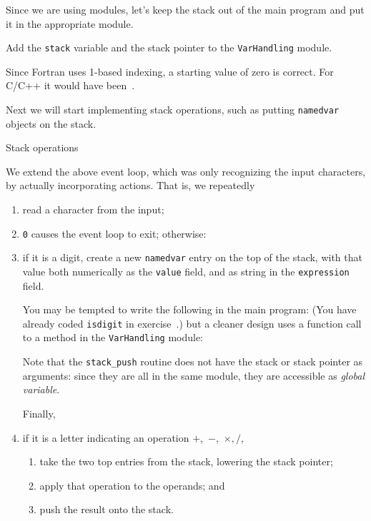 Since we are using modules, let's keep the stack out of the main program
and put it in the appropriate module.

\begin{exercise}
  \label{ex:f-stack-in-mod}
  Add the \lstinline{stack} variable and the stack pointer
  to the \lstinline{VarHandling} module.
\end{exercise}

Since Fortran uses 1-based indexing,
a starting value of zero is correct.
For C/C++ it would have been~.

Next we will start implementing stack operations,
such as putting \lstinline{namedvar} objects on the stack.

 {Stack operations}

We extend the above event loop,
which was only recognizing the input characters,
by actually incorporating actions.
That is, we repeatedly
\begin{enumerate}
\item read a character from the input;
\item \lstinline{0} causes the event loop to exit; otherwise:
\item if it is a digit, create a new \lstinline{namedvar} entry
  on the top of the stack, with that value both numerically as the
  \lstinline{value} field, and as string in the \lstinline{expression} field.

  You may be tempted to write the following in the main program:
  (You have already coded \lstinline{isdigit} in exercise~.)
  but a cleaner design uses a function call
  to a method in the \lstinline{VarHandling} module:
  \begin{multicols}{2}
    \columnbreak
  \end{multicols}
  Note that the \lstinline{stack_push} routine does not have the stack
  or stack pointer as arguments: since they are all in the same module,
  they are accessible as
  \emph{global variable}.

  Finally,
\item if it is a letter indicating an operation $+$,~$-$,~$\times,/$,
  \begin{enumerate}
  \item take the two top entries from the stack, lowering the stack pointer;
  \item apply that operation to the operands; and
  \item push the result onto the stack.
  \end{enumerate}
\end{enumerate}

